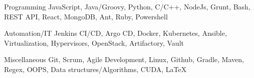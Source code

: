 

\begin{cvskills}

  \cvskill
    {Programming} %
    {JavaScript, Java/Groovy, Python, C/C++, NodeJs, Grunt, Bash, REST API, React, MongoDB, Ant, Ruby, Powershell} %

  \cvskill
    {Automation/IT} %
    {Jenkins CI/CD, Argo CD, Docker, Kubernetes, Ansible, Virtualization, Hypervisors, OpenStack, Artifactory, Vault} %

  \cvskill
    {Miscellaneous} %
    {Git, Scrum, Agile Development, Linux, Github, Gradle, Maven, Regex, OOPS, Data structures/Algorithms, CUDA, \LaTeX} %

\end{cvskills}
